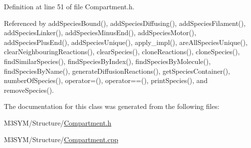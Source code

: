 Definition at line 51 of file Compartment.\+h.



Referenced by add\+Species\+Bound(), add\+Species\+Diffusing(), add\+Species\+Filament(), add\+Species\+Linker(), add\+Species\+Minus\+End(), add\+Species\+Motor(), add\+Species\+Plus\+End(), add\+Species\+Unique(), apply\+\_\+impl(), are\+All\+Species\+Unique(), clear\+Neighbouring\+Reactions(), clear\+Species(), clone\+Reactions(), clone\+Species(), find\+Similar\+Species(), find\+Species\+By\+Index(), find\+Species\+By\+Molecule(), find\+Species\+By\+Name(), generate\+Diffusion\+Reactions(), get\+Species\+Container(), number\+Of\+Species(), operator=(), operator==(), print\+Species(), and remove\+Species().



The documentation for this class was generated from the following files\+:\begin{DoxyCompactItemize}
\item 
M3\+S\+Y\+M/\+Structure/\hyperlink{Compartment_8h}{Compartment.\+h}\item 
M3\+S\+Y\+M/\+Structure/\hyperlink{Compartment_8cpp}{Compartment.\+cpp}\end{DoxyCompactItemize}
